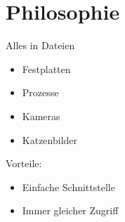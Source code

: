 \section[ph]{Philosophie}
\begin{frame}{Alles in Dateien}
\begin{itemize}
 \item Festplatten
 \item Prozesse
 \item Kameras
 \item Katzenbilder
\end{itemize}

Vorteile:
\begin{itemize}
 \item Einfache Schnittstelle
 \item Immer gleicher Zugriff 
\end{itemize}

\end{frame}

